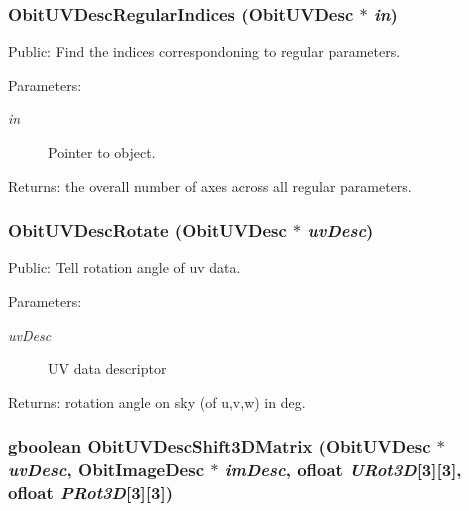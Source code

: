 \subsubsection{ Obit\-UVDesc\-Regular\-Indices ({\bf Obit\-UVDesc} $\ast$ {\em in})}\label{ObitUVDesc_8c_a15}


Public: Find the indices correspondoning to regular parameters. 

\begin{Desc}
\item[Parameters:]
\begin{description}
\item[{\em in}]Pointer to object. \end{description}
\end{Desc}
\begin{Desc}
\item[Returns:]the overall number of axes across all regular parameters. \end{Desc}
\subsubsection{ Obit\-UVDesc\-Rotate ({\bf Obit\-UVDesc} $\ast$ {\em uv\-Desc})}\label{ObitUVDesc_8c_a21}


Public: Tell rotation angle of uv data. 

\begin{Desc}
\item[Parameters:]
\begin{description}
\item[{\em uv\-Desc}]UV data descriptor \end{description}
\end{Desc}
\begin{Desc}
\item[Returns:]rotation angle on sky (of u,v,w) in deg. \end{Desc}
\subsubsection{\setlength{\rightskip}{0pt plus 5cm}gboolean Obit\-UVDesc\-Shift3DMatrix ({\bf Obit\-UVDesc} $\ast$ {\em uv\-Desc}, {\bf Obit\-Image\-Desc} $\ast$ {\em im\-Desc}, {\bf ofloat} {\em URot3D}[3][3], {\bf ofloat} {\em PRot3D}[3][3])}\label{ObitUVDesc_8c_a22}


